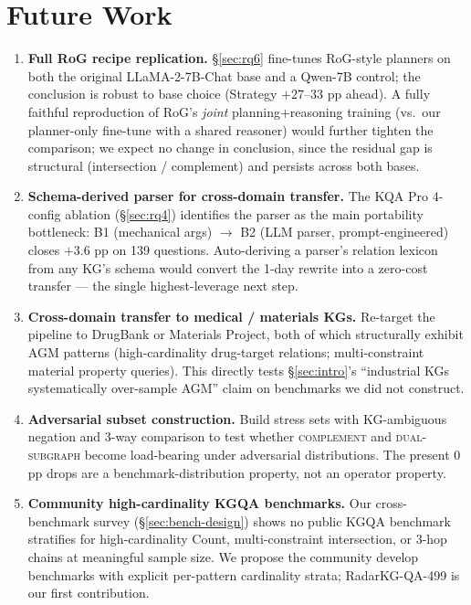 \documentclass[review]{elsarticle}
\newcommand{\op}[1]{\textsc{\small #1}}
\begin{document}
\section{Future Work}
\label{sec:future}

\begin{enumerate}[topsep=0pt,itemsep=2pt,leftmargin=*]
  \item \textbf{Full RoG recipe replication.} §\ref{sec:rq6} fine-tunes RoG-style planners on both the original LLaMA-2-7B-Chat base and a Qwen-7B control; the conclusion is robust to base choice (Strategy $+27$--$33$ pp ahead). A fully faithful reproduction of RoG's \emph{joint} planning+reasoning training (vs.\ our planner-only fine-tune with a shared reasoner) would further tighten the comparison; we expect no change in conclusion, since the residual gap is structural (intersection / complement) and persists across both bases.
  \item \textbf{Schema-derived parser for cross-domain transfer.} The KQA Pro 4-config ablation (§\ref{sec:rq4}) identifies the parser as the main portability bottleneck: B1 (mechanical args) $\to$ B2 (LLM parser, prompt-engineered) closes $+3.6$ pp on 139 questions. Auto-deriving a parser's relation lexicon from any KG's schema would convert the 1-day rewrite into a zero-cost transfer --- the single highest-leverage next step.
  \item \textbf{Cross-domain transfer to medical / materials KGs.} Re-target the pipeline to DrugBank or Materials Project, both of which structurally exhibit AGM patterns (high-cardinality drug-target relations; multi-constraint material property queries). This directly tests §\ref{sec:intro}'s ``industrial KGs systematically over-sample AGM'' claim on benchmarks we did not construct.
  \item \textbf{Adversarial subset construction.} Build stress sets with KG-ambiguous negation and 3-way comparison to test whether \op{complement} and \op{dual-subgraph} become load-bearing under adversarial distributions. The present 0 pp drops are a benchmark-distribution property, not an operator property.
  \item \textbf{Community high-cardinality KGQA benchmarks.} Our cross-benchmark survey (§\ref{sec:bench-design}) shows no public KGQA benchmark stratifies for high-cardinality Count, multi-constraint intersection, or 3-hop chains at meaningful sample size. We propose the community develop benchmarks with explicit per-pattern cardinality strata; RadarKG-QA-499 is our first contribution.
\end{enumerate}
\end{document}
